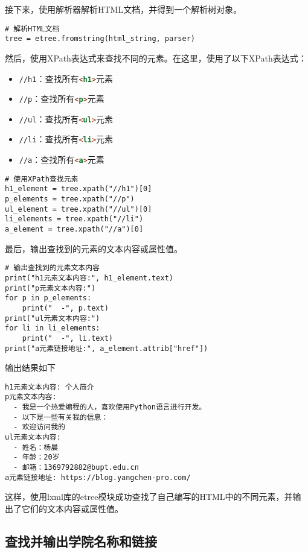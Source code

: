 \documentclass[lang=cn,11pt,a4paper]{elegantpaper}
\begin{document}
接下来，使用解析器解析HTML文档，并得到一个解析树对象。

\begin{lstlisting}
# 解析HTML文档
tree = etree.fromstring(html_string, parser)
\end{lstlisting}

然后，使用XPath表达式来查找不同的元素。在这里，使用了以下XPath表达式：
\begin{itemize}
    \item \lstinline{//h1}：查找所有\lstinline[language=html]{<h1>}元素
    \item \lstinline{//p}：查找所有\lstinline[language=html]{<p>}元素
    \item \lstinline{//ul}：查找所有\lstinline[language=html]{<ul>}元素
    \item \lstinline{//li}：查找所有\lstinline[language=html]{<li>}元素
    \item \lstinline{//a}：查找所有\lstinline[language=html]{<a>}元素
\end{itemize}


\begin{lstlisting}
# 使用XPath查找元素
h1_element = tree.xpath("//h1")[0]
p_elements = tree.xpath("//p")
ul_element = tree.xpath("//ul")[0]
li_elements = tree.xpath("//li")
a_element = tree.xpath("//a")[0]
\end{lstlisting}

最后，输出查找到的元素的文本内容或属性值。

\begin{lstlisting}
# 输出查找到的元素文本内容
print("h1元素文本内容:", h1_element.text)
print("p元素文本内容:")
for p in p_elements:
    print("  -", p.text)
print("ul元素文本内容:")
for li in li_elements:
    print("  -", li.text)
print("a元素链接地址:", a_element.attrib["href"])
\end{lstlisting}

输出结果如下
\begin{lstlisting}[language=text]
h1元素文本内容: 个人简介
p元素文本内容:
  - 我是一个热爱编程的人，喜欢使用Python语言进行开发。
  - 以下是一些有关我的信息：
  - 欢迎访问我的
ul元素文本内容:
  - 姓名：杨晨
  - 年龄：20岁
  - 邮箱：1369792882@bupt.edu.cn
a元素链接地址: https://blog.yangchen-pro.com/
\end{lstlisting}


这样，使用lxml库的etree模块成功查找了自己编写的HTML中的不同元素，并输出了它们的文本内容或属性值。

\subsection{查找并输出学院名称和链接}
\end{document}
